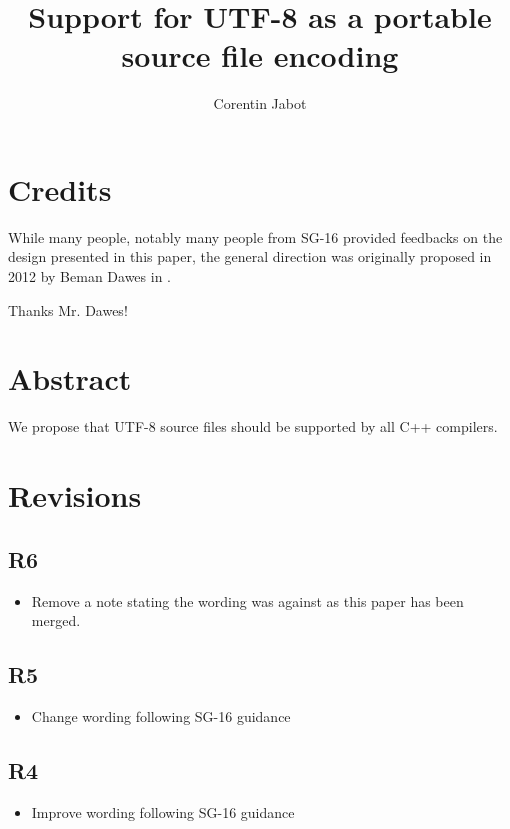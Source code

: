 \documentclass{wg21}
\title{Support for UTF-8 as a portable source file encoding}
\author{Corentin Jabot}{corentin.jabot@gmail.com}
\begin{document}
    
\maketitle


\section{Credits}

While many people, notably many people from SG-16 provided feedbacks on the design presented in this paper,
the general direction was originally proposed in 2012 by Beman Dawes in .

Thanks Mr. Dawes!

\section{Abstract}

We propose that UTF-8 source files should be supported by all C++ compilers.

\section{Revisions}

\subsection{R6}
\begin{itemize}
    \item Remove a note stating the wording was against  as this paper has been merged.
\end{itemize}

\subsection{R5}
\begin{itemize}
    \item Change wording following SG-16 guidance
\end{itemize}

\subsection{R4}
\begin{itemize}
    \item Improve wording following SG-16 guidance
\end{itemize}
\end{document}
